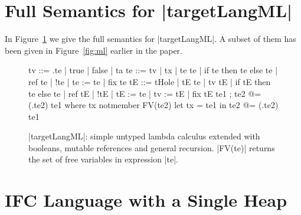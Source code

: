 \appendix


\section{Full Semantics for |targetLangML|}
\label{sec:app:semantics}

In Figure~\ref{fig:ml-full} we give the full semantics for |targetLangML|.  A subset
of them has been given in Figure~\ref{fig:ml} earlier in the paper.

\begin{figure}
\begin{code}
tv   ::= \tx.te | true | false | ta
te   ::= tv | tx | te te | if te then te else te | ref te | !te | te := te | fix te
tE   ::= tHole | tE te | tv tE | if tE then te else te | ref tE | !tE | tE := te | tv := tE | fix tE
te1 ; te2            @= (\tx.te2) te1  where  tx notmember FV(te2)
let tx = te1 in te2  @= (\tx.te2) te1
\end{code}

\caption{|targetLangML|: simple untyped lambda calculus extended with booleans,
mutable references and general recursion. |FV(te)| returns the set of free
variables in expression |te|.}
\label{fig:ml-full}
\end{figure}



\section{IFC Language with a Single Heap}
\label{sec:single-heap}


